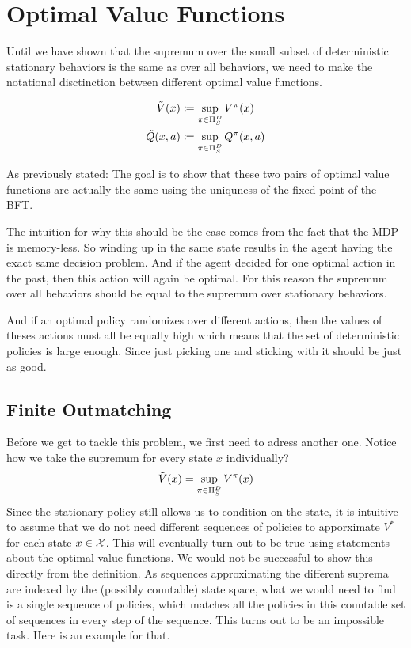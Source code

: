 \section{Optimal Value Functions}
Until we have shown that the supremum over the small subset of deterministic stationary behaviors is the same as over all behaviors, we need to make the notational disctinction between different optimal value functions.

\begin{definition}
\begin{align*}
	\tilde{V}(x)&\coloneqq \sup_{\pi\in\Pi_S^D} V^\pi(x)\\
	\tilde{Q}(x,a)&\coloneqq \sup_{\pi\in\Pi_S^D} Q^\pi(x,a)
\end{align*}
\end{definition}

As previously stated: The goal is to show that these two pairs of optimal value functions are actually the same using the uniquness of the fixed point of the BFT. 

The intuition for why this should be the case comes from the fact that the MDP is memory-less. So winding up in the same state results in the agent having the exact same decision problem. And if the agent decided for one optimal action in the past, then this action will again be optimal. For this reason the supremum over all behaviors should be equal to the supremum over stationary behaviors. 

And if an optimal policy randomizes over different actions, then the values of theses actions must all be equally high which means that the set of deterministic policies is large enough. Since just picking one and sticking with it should be just as good.

\subsection{Finite Outmatching}
Before we get to tackle this problem, we first need to adress another one. Notice how we take the supremum for every state \(x\) individually? 
\begin{equation*}
\tilde{V}(x)=\sup_{\pi\in\Pi_S^D}V^\pi(x) 
\end{equation*}
Since the stationary policy still allows us to condition on the state, it is intuitive to assume that we do not need different sequences of policies to apporximate \(V^*\) for each state \(x\in\mathcal{X}\). This will eventually turn out to be true using statements about the optimal value functions. We would not be successful to show this directly from the definition. As sequences approximating the different suprema are indexed by the (possibly countable) state space, what we would need to find is a single sequence of policies, which matches all the policies in this countable set of sequences in every step of the sequence. This turns out to be an impossible task. Here is an example for that. 

